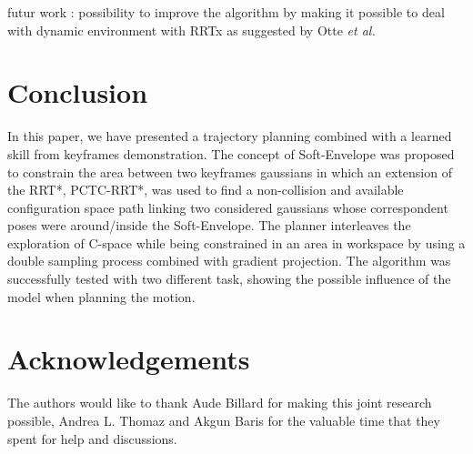 \documentclass[letterpaper, 10 pt, conference]{ieeeconf}  %
\begin{document}
futur work : possibility to improve the algorithm by making it possible to deal with dynamic environment with RRTx as suggested by Otte \textit{et al.} \cite{RRTx}

\section{Conclusion}
In this paper, we have presented a trajectory planning combined with a learned skill from keyframes demonstration. The concept of Soft-Envelope was proposed to constrain the area between two keyframes gaussians in which an extension of the RRT*, PCTC-RRT*, was used to find a non-collision and available configuration space path linking two considered gaussians whose correspondent poses were around/inside the Soft-Envelope. The planner interleaves the exploration of C-space while being constrained in an area in workspace by using a double sampling process combined with gradient projection.
The algorithm was successfully tested with two different task, showing the possible influence of the model when planning the motion. 

\section{Acknowledgements}
The authors would like to thank Aude Billard for making this joint research possible, Andrea L. Thomaz and Akgun Baris for the valuable time that they spent for help and discussions.


\end{document}
